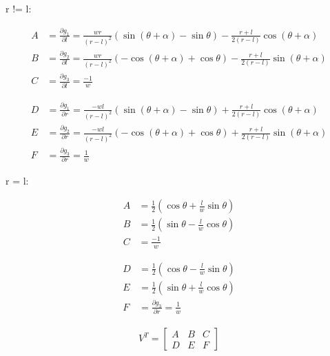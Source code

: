 \documentclass[oneside, 12pt, a4paper]{book}
\begin{document}
r != l:

\begin{equation}
    \begin{split}
        A &= \frac{\partial g_1}{\partial l} = \frac{wr}{(r-l)^2}(\sin(\theta + \alpha) - \sin{\theta}) - \frac{r+l}{2(r-l)}\cos(\theta + \alpha)\\
        B &= \frac{\partial g_2}{\partial l} = \frac{wr}{(r-l)^2}(-\cos(\theta + \alpha) + \cos{\theta}) - \frac{r+l}{2(r-l)}\sin(\theta + \alpha)\\
        C &= \frac{\partial g_3}{\partial l} = \frac{-1}{w}
    \end{split}
\end{equation}

\begin{equation}
    \begin{split}
        D &= \frac{\partial g_1}{\partial r} = \frac{-wl}{(r-l)^2}(\sin(\theta + \alpha) - \sin{\theta}) + \frac{r+l}{2(r-l)}\cos(\theta + \alpha)\\
        E &= \frac{\partial g_2}{\partial r} = \frac{-wl}{(r-l)^2}(-\cos(\theta + \alpha) + \cos{\theta}) + \frac{r+l}{2(r-l)}\sin(\theta + \alpha)\\
        F &= \frac{\partial g_3}{\partial r} = \frac{1}{w}
    \end{split}
\end{equation}

r = l:

\begin{equation}
    \begin{split}
        A &= \frac{1}{2}(\cos\theta+\frac{l}{w}\sin\theta)\\
        B &= \frac{1}{2}(\sin\theta-\frac{l}{w}\cos\theta)\\
        C &= \frac{-1}{w}
    \end{split}
\end{equation}

\begin{equation}
    \begin{split}
        D &= \frac{1}{2}(\cos\theta - \frac{l}{w}\sin\theta)\\
        E &= \frac{1}{2}(\sin\theta + \frac{l}{w}\cos\theta)\\
        F &= \frac{\partial g_3}{\partial r} = \frac{1}{w}
    \end{split}
\end{equation}

\begin{equation}
    \begin{split}
        V^T = \begin{bmatrix}
            A & B & C \\
            D & E & F
        \end{bmatrix}
    \end{split}
\end{equation}
\end{document}
